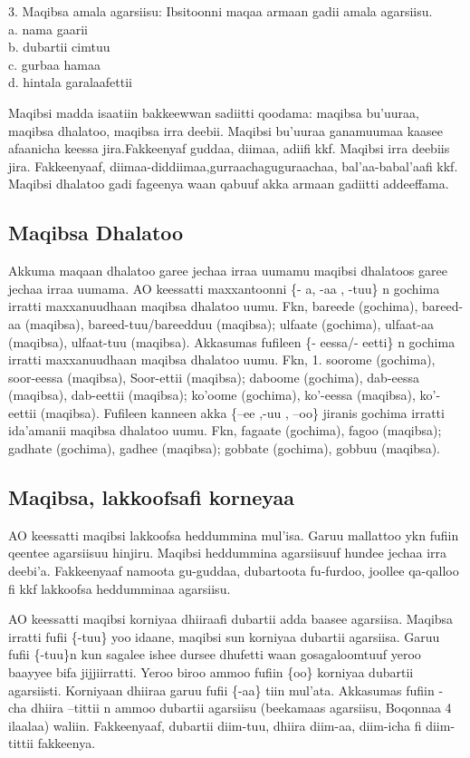 \documentclass[11pt,b5paper]{book}
\begin{document}
3. Maqibsa amala agarsiisu: Ibsitoonni maqaa armaan gadii amala agarsiisu.\\
a. nama gaarii \\
b. dubartii cimtuu \\
c. gurbaa hamaa \\
d. hintala garalaafettii 

Maqibsi madda isaatiin bakkeewwan sadiitti qoodama: maqibsa bu'uuraa, maqibsa dhalatoo, maqibsa irra deebii. Maqibsi bu’uuraa ganamuumaa kaasee afaanicha keessa jira.Fakkeenyaf guddaa, diimaa, adiifi kkf. Maqibsi irra deebiis jira. Fakkeenyaaf, diimaa-diddiimaa,gurraachaguguraachaa, bal’aa-babal’aafi kkf. Maqibsi dhalatoo gadi fageenya waan qabuuf akka armaan gadiitti addeeffama. 

\subsection{Maqibsa Dhalatoo}

Akkuma maqaan dhalatoo garee jechaa irraa uumamu maqibsi dhalatoos garee jechaa irraa uumama. AO keessatti
maxxantoonni \{- a, -aa , -tuu\} n gochima irratti maxxanuudhaan maqibsa dhalatoo uumu. Fkn, bareede (gochima), bareed-aa (maqibsa), bareed-tuu/bareedduu (maqibsa); ulfaate (gochima), ulfaat-aa (maqibsa), ulfaat-tuu (maqibsa). Akkasumas fufileen \{- eessa/- eetti\} n gochima irratti maxxanuudhaan maqibsa dhalatoo uumu. Fkn, 1. soorome (gochima), soor-eessa (maqibsa), Soor-ettii (maqibsa); daboome (gochima), dab-eessa (maqibsa), dab-eettii (maqibsa); ko’oome (gochima), ko’-eessa (maqibsa), ko’-eettii (maqibsa). Fufileen kanneen akka \{–ee ,-uu , –oo\} jiranis gochima irratti ida’amanii maqibsa dhalatoo uumu. Fkn, fagaate (gochima), fagoo (maqibsa); gadhate (gochima), gadhee (maqibsa); gobbate (gochima), gobbuu (maqibsa).

\subsection{Maqibsa, lakkoofsafi korneyaa}
AO keessatti maqibsi lakkoofsa heddummina mul'isa. Garuu mallattoo ykn fufiin qeentee agarsiisuu hinjiru. Maqibsi
heddummina agarsiisuuf hundee jechaa irra deebi'a. Fakkeenyaaf namoota gu-guddaa, dubartoota fu-furdoo, joollee qa-qalloo fi kkf lakkoofsa heddumminaa agarsiisu. 

AO keessatti maqibsi korniyaa dhiiraafi dubartii adda baasee agarsiisa. Maqibsa irratti fufii \{-tuu\} yoo idaane, maqibsi sun korniyaa dubartii agarsiisa. Garuu fufii \{-tuu\}n kun sagalee ishee dursee dhufetti waan gosagaloomtuuf yeroo baayyee bifa jijjiirratti. Yeroo biroo ammoo fufiin \{oo\} korniyaa dubartii agarsiisti. Korniyaan dhiiraa garuu fufii \{-aa\} tiin mul'ata. Akkasumas fufiin - cha dhiira –tittii n ammoo dubartii agarsiisu (beekamaas agarsiisu, Boqonnaa 4 ilaalaa) waliin. Fakkeenyaaf, dubartii diim-tuu, dhiira diim-aa, diim-icha fi diim-tittii fakkeenya.
\end{document}
